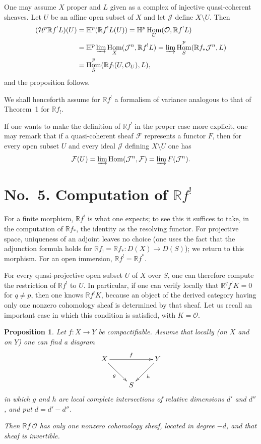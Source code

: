 \documentclass[11pt]{amsart}
\DeclareMathOperator{\Hom}{Hom}
\newcommand{\cF}{\mathcal{F}}
\newcommand{\cH}{\mathcal{H}}
\newcommand{\cJ}{\mathcal{J}}
\newcommand{\cO}{\mathcal{O}}
\newcommand{\cD}{D}
\newcommand{\bH}{\mathbb{H}}
\newcommand{\bR}{\mathbb{R}}
\theoremstyle{plain}
\newtheorem{prop}{Proposition}
\theoremstyle{definition}
\begin{document}
One may assume $X$ proper and $L$ given as a complex of injective quasi-coherent sheaves. Let $U$ be an affine open subset of $X$ and let $\cJ$ define $X\setminus U$. Then
\begin{align*}
(\cH^p\bR f^{!}L)(U) &= \bH^p(\bR f^{!}L(U)) = \bH^p\Hom_U(\cO,\bR f^{!}L) \\
&= \bH^p\varinjlim \Hom_X(\cJ^n,\bR f^{!}L) = \varinjlim \Hom^p_S(\bR f_*\cJ^n,L) \\
&= \Hom^p_S(\bR f_!(U,\cO_U),L),
\end{align*}
and the proposition follows.

We shall henceforth assume for $\bR f^{!}$ a formalism of variance analogous to that of Theorem~1 for $\bR f_!$.

If one wants to make the definition of $\bR f^{!}$ in the proper case more explicit, one may remark that if a quasi-coherent sheaf $\cF$ represents a functor $F$, then for every open subset $U$ and every ideal $\cJ$ defining $X\setminus U$ one has
\[
\cF(U)=\varinjlim \Hom(\cJ^n,\cF)=\varinjlim F(\cJ^n).
\]

\section*{No.~5. Computation of $\bR f^{!}$}

For a finite morphism, $\bR f^{!}$ is what one expects; to see this it suffices to take, in the computation of $\bR f_*$, the identity as the resolving functor. For projective space, uniqueness of an adjoint leaves no choice (one uses the fact that the adjunction formula holds for $\bR f_!=\bR f_*\colon \cD(X)\to \cD(S)$); we return to this morphism. For an open immersion, $\bR f^{!}=\bR f^{*}$.

For every quasi-projective open subset $U$ of $X$ over $S$, one can therefore compute the restriction of $\bR f^{!}$ to $U$. In particular, if one can verify locally that $\bR^q f^{!}K=0$ for $q\neq p$, then one knows $\bR f^{!}K$, because an object of the derived category having only one nonzero cohomology sheaf is determined by that sheaf. Let us recall an important case in which this condition is satisfied, with $K=\cO$.

\begin{prop}
Let $f\colon X\to Y$ be compactifiable. Assume that locally (on $X$ and on $Y$) one can find a diagram
\[
\xymatrix{
X \ar[rr]^f \ar[dr]_g && Y \ar[dl]^h \\
& S &
}
\]
in which $g$ and $h$ are local complete intersections of relative dimensions $d'$ and $d''$, and put $d=d'-d''$.

Then $\bR f^{!}\cO$ has only one nonzero cohomology sheaf, located in degree $-d$, and that sheaf is invertible.
\end{prop}
\end{document}
